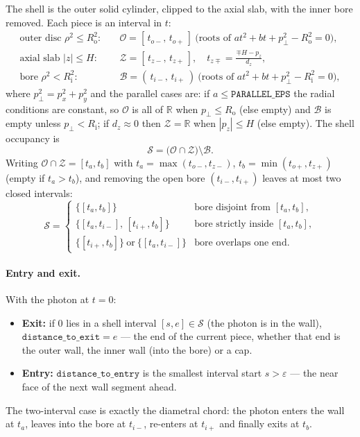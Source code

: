 \documentclass[11pt]{article}
\newcommand{\Ri}{R_{\mathrm{i}}}
\newcommand{\Ro}{R_{\mathrm{o}}}
\begin{document}
The shell is the outer solid cylinder, clipped to the axial slab, with the inner
bore removed. Each piece is an interval in $t$:
\begin{align}
  \text{outer disc } \rho^2 \le \Ro^2: &\quad
    \mathcal{O} = [\,t_{o-},\,t_{o+}\,]
    \ \text{(roots of } a t^2 + b t + p_\perp^2 - \Ro^2 = 0),\\
  \text{axial slab } |z|\le H: &\quad
    \mathcal{Z} = [\,t_{z-},\,t_{z+}\,], \quad
    t_{z\mp} = \frac{\mp H - p_z}{d_z},\\
  \text{bore } \rho^2 < \Ri^2: &\quad
    \mathcal{B} = (\,t_{i-},\,t_{i+}\,)
    \ \text{(roots of } a t^2 + b t + p_\perp^2 - \Ri^2 = 0),
\end{align}
where $p_\perp^2 = p_x^2+p_y^2$ and the parallel cases are: if $a\le\texttt{PARALLEL\_EPS}$
the radial conditions are constant, so $\mathcal{O}$ is all of $\mathbb{R}$ when
$p_\perp \le \Ro$ (else empty) and $\mathcal{B}$ is empty unless $p_\perp<\Ri$; if
$d_z\approx 0$ then $\mathcal{Z}=\mathbb{R}$ when $|p_z|\le H$ (else empty). The shell
occupancy is
\begin{equation}
  \mathcal{S} = \bigl(\mathcal{O}\cap\mathcal{Z}\bigr)\setminus\mathcal{B}.
\end{equation}
Writing $\mathcal{O}\cap\mathcal{Z}=[t_a,t_b]$ with
$t_a=\max(t_{o-},t_{z-})$, $t_b=\min(t_{o+},t_{z+})$ (empty if $t_a>t_b$), and
removing the open bore $(t_{i-},t_{i+})$ leaves at most two closed intervals:
\begin{equation}
  \mathcal{S} =
  \begin{cases}
    \{[t_a,t_b]\} & \text{bore disjoint from } [t_a,t_b],\\[2pt]
    \{[t_a,t_{i-}],\,[t_{i+},t_b]\} & \text{bore strictly inside } [t_a,t_b],\\[2pt]
    \{[t_{i+},t_b]\}\ \text{or}\ \{[t_a,t_{i-}]\} & \text{bore overlaps one end.}
  \end{cases}
\end{equation}

\paragraph{Entry and exit.} With the photon at $t=0$:
\begin{itemize}[nosep]
\item \textbf{Exit:} if $0$ lies in a shell interval $[s,e]\in\mathcal{S}$ (the photon
  is in the wall), $\texttt{distance\_to\_exit}=e$ --- the end of the current piece,
  whether that end is the outer wall, the inner wall (into the bore) or a cap.
\item \textbf{Entry:} $\texttt{distance\_to\_entry}$ is the smallest interval start
  $s>\varepsilon$ --- the near face of the next wall segment ahead.
\end{itemize}
The two-interval case is exactly the diametral chord: the photon enters the wall at
$t_a$, leaves into the bore at $t_{i-}$, re-enters at $t_{i+}$ and finally exits at
$t_b$.
\end{document}
